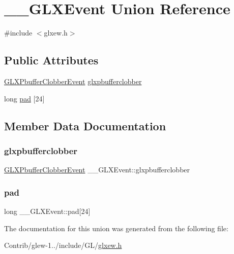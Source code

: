 \hypertarget{union_____g_l_x_event}{}\section{\+\_\+\+\_\+\+G\+L\+X\+Event Union Reference}
\label{union_____g_l_x_event}


{\ttfamily \#include $<$glxew.\+h$>$}

\subsection*{Public Attributes}
\begin{DoxyCompactItemize}
\item 
\mbox{\hyperlink{struct_g_l_x_pbuffer_clobber_event}{G\+L\+X\+Pbuffer\+Clobber\+Event}} \mbox{\hyperlink{union_____g_l_x_event_ada5880e2b424bcb2f60a411aaf713fae}{glxpbufferclobber}}
\item 
long \mbox{\hyperlink{union_____g_l_x_event_a1cb8f6e7e77a34d25baf43b3f3bc2d4f}{pad}} \mbox{[}24\mbox{]}
\end{DoxyCompactItemize}


\subsection{Member Data Documentation}
\mbox{\label{union_____g_l_x_event_ada5880e2b424bcb2f60a411aaf713fae}} 
\subsubsection{\texorpdfstring{glxpbufferclobber}{glxpbufferclobber}}
{\footnotesize\ttfamily \mbox{\hyperlink{struct_g_l_x_pbuffer_clobber_event}{G\+L\+X\+Pbuffer\+Clobber\+Event}} \+\_\+\+\_\+\+G\+L\+X\+Event\+::glxpbufferclobber}

\mbox{\label{union_____g_l_x_event_a1cb8f6e7e77a34d25baf43b3f3bc2d4f}} 
\subsubsection{\texorpdfstring{pad}{pad}}
{\footnotesize\ttfamily long \+\_\+\+\_\+\+G\+L\+X\+Event\+::pad\mbox{[}24\mbox{]}}



The documentation for this union was generated from the following file\+:\begin{DoxyCompactItemize}
\item 
Contrib/glew-\/1../include/\+G\+L/\mbox{\hyperlink{glxew_8h}{glxew.\+h}}\end{DoxyCompactItemize}
